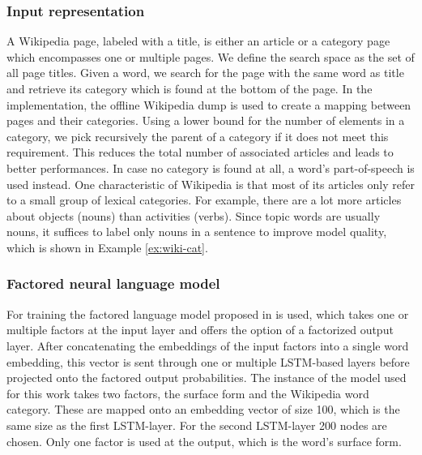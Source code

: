 \documentclass[a4paper]{article}
\begin{document}
\subsubsection{Input representation}
A Wikipedia page, labeled with a title, is either an article or a category page which encompasses one or multiple pages.
We define the search space as the set of all page titles. Given a word, we search for the page with the same word as title and retrieve its category which is found at the bottom of the page.
In the implementation, the offline Wikipedia dump is used to create a mapping between pages and their categories. Using a lower bound for the number of elements in a category, we pick recursively the parent of a category if it does not meet this requirement. This reduces the total number of associated articles and leads to better performances. In case no category is found at all, a word's part-of-speech is used instead.
One characteristic of Wikipedia is that most of its articles only refer to a small group of lexical categories. For example, there are a lot more articles about objects (nouns) than activities (verbs). Since topic words are usually nouns, it suffices to label only nouns in a sentence to improve model quality, which is shown in Example \ref{ex:wiki-cat}.

\subsubsection{Factored neural language model}
For training the factored language model proposed in \cite{niehuesusing} is used, which takes one or multiple factors at the input layer and offers the option of a factorized output layer. After concatenating the embeddings of the input factors into a single word embedding, this vector is sent through one or multiple LSTM-based layers \cite{hochreiter1997long} before projected onto the factored output probabilities. The instance of the model used for this work takes two factors, the surface form and the Wikipedia word category. These are mapped onto an embedding vector of size 100, which is the same size as the first LSTM-layer. For the second LSTM-layer 200 nodes are chosen. Only one factor is used at the output, which is the word's surface form.
\end{document}
